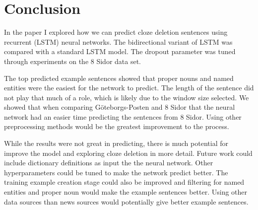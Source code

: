 \documentclass[11pt,a4paper]{article}
\begin{document}
\section{Conclusion}
In the paper I explored how we can predict cloze deletion sentences using recurrent (LSTM) neural networks.
The bidirectional variant of LSTM was compared with a standard LSTM model.
The dropout parameter was tuned through experiments on the 8 Sidor data set.

The top predicted example sentences showed that proper nouns and named entities were the easiest for the network to predict.
The length of the sentence did not play that much of a role, which is likely due to the window size selected.
We showed that when comparing Göteborgs-Posten and 8 Sidor that the neural network had an easier time predicting the sentences from 8 Sidor.
Using other preprocessing methods would be the greatest improvement to the process.

While the results were not great in predicting, there is much potential for improve the model and exploring cloze deletion in more detail.
Future work could include dictionary definitions as input the the neural network.
Other hyperparameters could be tuned to make the network predict better.
The training example creation stage could also be improved and filtering for named entities and proper noun would make the example sentences better.
Using other data sources than news sources would potentially give better example sentences.



\end{document}
